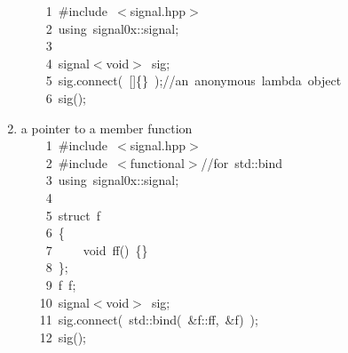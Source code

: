 \documentclass[9pt,onside,a4paper]{article}
\newcommand{\hlstd}[1]{\textcolor[rgb]{0.2,0,0.4}{#1}}
\newcommand{\hlslc}[1]{\textcolor[rgb]{0,0.4,0.2}{#1}}
\newcommand{\hlppc}[1]{\textcolor[rgb]{0.33,0.45,0.69}{#1}}
\newcommand{\hlopt}[1]{\textcolor[rgb]{0.33,0.33,0.33}{#1}}
\newcommand{\hllin}[1]{\textcolor[rgb]{0.6,0.6,0.6}{#1}}
\newcommand{\hlkwa}[1]{\textcolor[rgb]{1,0.19,0.19}{#1}}
\newcommand{\hlkwb}[1]{\textcolor[rgb]{0.96,0.55,0.14}{#1}}
\newcommand{\hlkwd}[1]{\textcolor[rgb]{0.82,0.11,0.93}{#1}}
\begin{document}
\begin{enumerate}
\noindent
\ttfamily
\hlstd{}\hllin{\ \ \ \ 1\ }\hlppc{\#include\ $<$signal.hpp$>$}\\
\hllin{\ \ \ \ 2\ }\hlstd{}\hlkwa{using\ }\hlstd{signal0x}\hlopt{::}\hlstd{signal}\hlopt{;}\\
\hllin{\ \ \ \ 3\ }\hlstd{\\
\hllin{\ \ \ \ 4\ }signal}\hlopt{$<$}\hlstd{}\hlkwb{void}\hlstd{}\hlopt{$>$\ }\hlstd{sig}\hlopt{;}\\
\hllin{\ \ \ \ 5\ }\hlstd{sig}\hlopt{.}\hlstd{}\hlkwd{connect}\hlstd{}\hlopt{(\ {[}{]}\{\}\ );}\hlstd{}\hlslc{//an\ anonymous\ lambda\ object}\\
\hllin{\ \ \ \ 6\ }\hlstd{}\hlkwd{sig}\hlstd{}\hlopt{();}\hlstd{}\\
\mbox{}
\normalfont
\normalsize




\item a pointer to a member function \\

\noindent
\ttfamily
\hlstd{}\hllin{\ \ \ \ 1\ }\hlppc{\#include\ $<$signal.hpp$>$}\\
\hllin{\ \ \ \ 2\ }\hlstd{}\hlppc{\#include\ $<$functional$>$}\hlslc{//for\ std::bind\ }\\
\hllin{\ \ \ \ 3\ }\hlppc{}\hlstd{}\hlkwa{using\ }\hlstd{signal0x}\hlopt{::}\hlstd{signal}\hlopt{;}\\
\hllin{\ \ \ \ 4\ }\hlstd{}\\
\hllin{\ \ \ \ 5\ }\hlkwb{struct\ }\hlstd{f}\\
\hllin{\ \ \ \ 6\ }\hlopt{\{}\\
\hllin{\ \ \ \ 7\ }\hlstd{}\hlstd{\ \ \ \ }\hlstd{}\hlkwb{void\ }\hlstd{}\hlkwd{ff}\hlstd{}\hlopt{()\ \{\}}\\
\hllin{\ \ \ \ 8\ }\hlstd{}\hlopt{\};}\\
\hllin{\ \ \ \ 9\ }\hlstd{f\ f\textunderscore }\hlopt{;}\\
\hllin{\ \ \ 10\ }\hlstd{signal}\hlopt{$<$}\hlstd{}\hlkwb{void}\hlstd{}\hlopt{$>$\ }\hlstd{sig}\hlopt{;}\\
\hllin{\ \ \ 11\ }\hlstd{sig}\hlopt{.}\hlstd{}\hlkwd{connect}\hlstd{}\hlopt{(\ }\hlstd{std}\hlopt{::}\hlstd{}\hlkwd{bind}\hlstd{}\hlopt{(\ \&}\hlstd{f}\hlopt{::}\hlstd{ff}\hlopt{,\ \&}\hlstd{f\textunderscore }\hlopt{)\ );}\\
\hllin{\ \ \ 12\ }\hlstd{}\hlkwd{sig}\hlstd{}\hlopt{();}\hlstd{}\\
\mbox{}
\normalfont
\normalsize

\end{enumerate}
\end{document}
